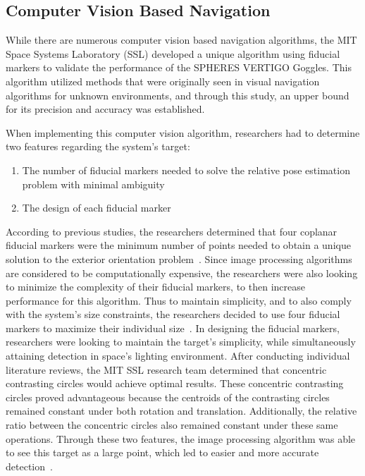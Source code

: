 \documentclass[journal, 10pt]{IEEEtran}
\begin{document}
\subsection{Computer Vision Based Navigation}
While there are numerous computer vision based navigation algorithms, the MIT Space Systems Laboratory (SSL) developed a unique algorithm using fiducial markers to validate the performance of the SPHERES VERTIGO Goggles. This algorithm utilized methods that were originally seen in visual navigation algorithms for unknown environments, and through this study, an upper bound for its precision and accuracy was established.


When implementing this computer vision algorithm, researchers had to determine two features regarding the system's target:
\begin{enumerate}
\item The number of fiducial markers needed to solve the relative pose estimation problem with minimal ambiguity
\item The design of each fiducial marker
\end{enumerate}

According to previous studies, the researchers determined that four coplanar fiducial markers were the minimum number of points needed to obtain a unique solution to the exterior orientation problem~\cite{Thesis}. Since image processing algorithms are considered to be computationally expensive, the researchers were also looking to minimize the complexity of their fiducial markers, to then increase performance for this algorithm. Thus to maintain simplicity, and to also comply with the system's size constraints, the researchers decided to use four fiducial markers to maximize their individual size~\cite{Vision, Thesis}. In designing the fiducial markers, researchers were looking to maintain the target's simplicity, while simultaneously attaining detection in space's lighting environment. After conducting individual literature reviews, the MIT SSL research team determined that concentric contrasting circles would achieve optimal results. These concentric contrasting circles proved advantageous because the centroids of the contrasting circles remained constant under both rotation and translation. Additionally, the relative ratio between the concentric circles also remained constant under these same operations. Through these two features,  the image processing algorithm was able to see this target as a large point, which led to easier and more accurate detection~\cite{Vision, Thesis}.
\end{document}
